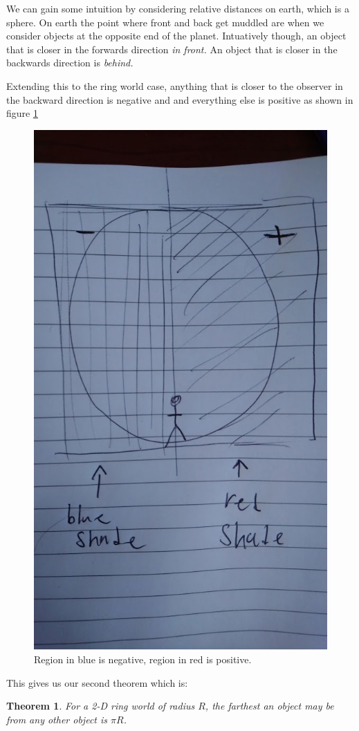 \documentclass{amsart}
\newtheorem{theorem}{Theorem}[section]
\theoremstyle{definition}
\begin{document}
We can gain some intuition by considering relative distances on earth, which is a sphere. On earth the point where front and back get muddled
 are when we consider objects at the opposite end of the planet. Intuatively though, an object that is closer in the forwards direction \textit{in front.} 
 An object that is closer in the backwards direction is \textit{behind.} \newline

Extending this to the ring world case, anything that is closer to the observer in the backward direction is negative and and everything 
else is positive as shown in figure \ref{fig:neg_positive_horizontal}




\begin{figure}
	\centering
	\includegraphics[width=0.7\linewidth]{figures/define_neg_pos_rough.JPG}
	\caption{Region in blue is negative, region in red is positive.}
	\label{fig:neg_positive_horizontal}
\end{figure}

This gives us our second theorem which is: 
\begin{theorem}
  For a 2-D ring world of radius $R$, the farthest an object may be from any other object is $\pi R$.
\end{theorem}
\end{document}
